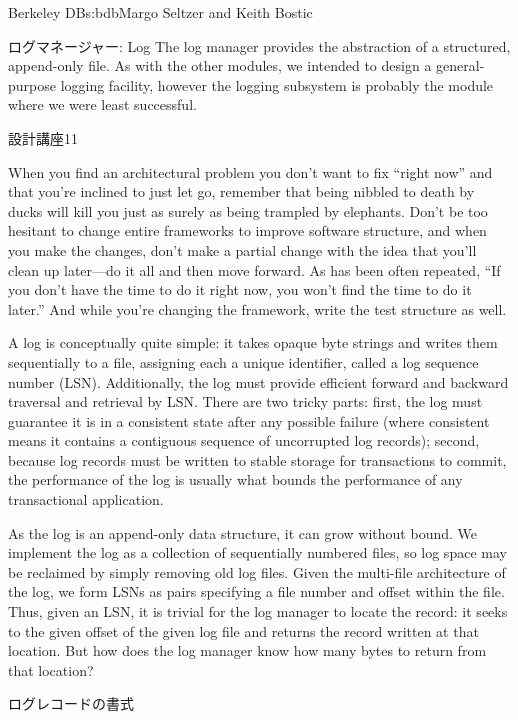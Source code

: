 \begin{aosachapter}{Berkeley DB}{s:bdb}{Margo Seltzer and Keith Bostic}
\begin{aosasect1}{ログマネージャー: Log}
The log manager provides the abstraction of a structured, append-only
file. As with the other modules, we intended to design a
general-purpose logging facility, however the logging subsystem is
probably the module where we were least successful. 

\begin{aosabox}{設計講座11}

When you find an architectural problem you don't want to fix ``right
now'' and that you're inclined to just let go, remember that being
nibbled to death by ducks will kill you just as surely as being
trampled by elephants. Don't be too hesitant to change entire
frameworks to improve software structure, and when you make the
changes, don't make a partial change with the idea that you'll clean
up later---do it all and then move forward. As has been often
repeated, ``If you don't have the time to do it right now, you won't
find the time to do it later.'' And while you're changing the
framework, write the test structure as well.

\end{aosabox}

A log is conceptually quite simple: it takes opaque byte strings and
writes them sequentially to a file, assigning each a unique
identifier, called a log sequence number (LSN). Additionally, the log
must provide efficient forward and backward traversal and retrieval by
LSN\@.  There are two tricky parts: first, the log must guarantee it is
in a consistent state after any possible failure (where consistent
means it contains a contiguous sequence of uncorrupted log records);
second, because log records must be written to stable storage for
transactions to commit, the performance of the log is usually what
bounds the performance of any transactional application.

As the log is an append-only data structure, it can grow without
bound.  We implement the log as a collection of sequentially numbered
files, so log space may be reclaimed by simply removing old log
files. Given the multi-file architecture of the log, we form LSNs as
pairs specifying a file number and offset within the file. Thus, given
an LSN, it is trivial for the log manager to locate the record: it
seeks to the given offset of the given log file and returns the record
written at that location. But how does the log manager know how many
bytes to return from that location?

\begin{aosasect2}{ログレコードの書式}


\end{aosasect2}
\end{aosasect1}
\end{aosachapter}
